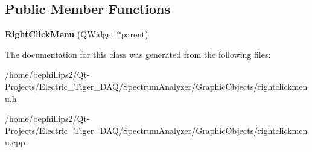 \subsection*{Public Member Functions}
\begin{DoxyCompactItemize}
\item 
{\bfseries Right\+Click\+Menu} (Q\+Widget $\ast$parent)\hypertarget{class_right_click_menu_afa4f52467f82c6d5de54999ba037428f}{}\label{class_right_click_menu_afa4f52467f82c6d5de54999ba037428f}

\end{DoxyCompactItemize}


The documentation for this class was generated from the following files\+:\begin{DoxyCompactItemize}
\item 
/home/bephillips2/\+Qt-\/\+Projects/\+Electric\+\_\+\+Tiger\+\_\+\+D\+A\+Q/\+Spectrum\+Analyzer/\+Graphic\+Objects/rightclickmenu.\+h\item 
/home/bephillips2/\+Qt-\/\+Projects/\+Electric\+\_\+\+Tiger\+\_\+\+D\+A\+Q/\+Spectrum\+Analyzer/\+Graphic\+Objects/rightclickmenu.\+cpp\end{DoxyCompactItemize}
